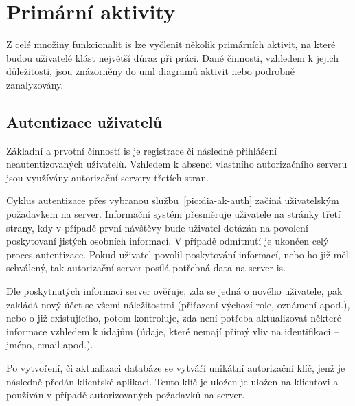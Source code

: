 \section{Primární aktivity}

Z celé množiny funkcionalit \gls{is} lze vyčlenit několik primárních aktivit, na které budou uživatelé klást největší důraz při práci. Dané činnosti, vzhledem k jejich důležitosti, jsou znázorněny do \gls{uml} diagramů aktivit nebo podrobně zanalyzovány.




\subsection{Autentizace uživatelů}

Základní a prvotní činností \gls{is} je registrace či následné přihlášení neautentizovaných uživatelů. Vzhledem k absenci vlastního autorizačního serveru jsou využívány autorizační servery třetích stran.

Cyklus autentizace přes vybranou službu~\ref{pic:dia-ak-auth} začíná uživatelským požadavkem na server. Informační systém přesměruje uživatele na stránky třetí strany, kdy v případě první návštěvy bude uživatel dotázán na povolení poskytovaní jistých osobních informací. V případě odmítnutí je ukončen celý proces autentizace. Pokud uživatel povolil poskytování informací, nebo ho již měl schválený, tak autorizační server posílá potřebná data na server \gls{is}.

Dle poskytnutých informací server ověřuje, zda se jedná o nového uživatele, pak zakládá nový účet se všemi náležitostmi (přiřazení výchozí role, oznámení apod.), nebo o již existujícího, potom kontroluje, zda není potřeba aktualizovat některé informace vzhledem k údajům (údaje, které nemají přímý vliv na identifikaci -- jméno, email apod.).

Po vytvoření, či aktualizaci databáze se vytváří unikátní autorizační klíč, jenž je následně předán klientské aplikaci. Tento klíč je uložen je uložen na klientovi a používán v případě autorizovaných požadavků na server.


